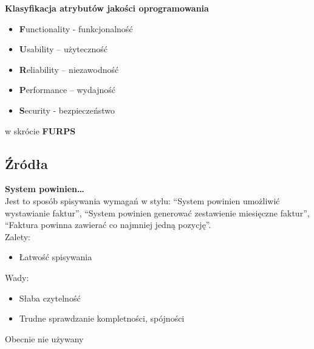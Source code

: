 \documentclass[12pt]{article}
\begin{document}
    \begin{definition}
        \textbf{Klasyfikacja atrybutów jakości oprogramowania}
        \begin{itemize}
            \item \textbf{F}unctionality - funkcjonalność
            \item \textbf{U}sability – użyteczność
            \item \textbf{R}eliability – niezawodność
            \item \textbf{P}erformance – wydajność
            \item \textbf{S}ecurity - bezpieczeństwo
        \end{itemize}
        w skrócie \textbf{FURPS}
    \end{definition}

    \subsection{Źródła}

    \begin{definition}
        \textbf{System powinien…} \\
        Jest to sposób spisywania wymagań w stylu: ``System powinien umożliwić wystawianie faktur'', ``System powinien generować zestawienie miesięczne faktur'', ``Faktura powinna zawierać co najmniej jedną pozycję''. \\

        Zalety:
        \begin{itemize}
            \item Łatwość spisywania
        \end{itemize}

        Wady:
        \begin{itemize}
            \item Słaba czytelność
            \item Trudne sprawdzanie kompletności, spójności
        \end{itemize}

        Obecnie nie używany
    \end{definition}
\end{document}
